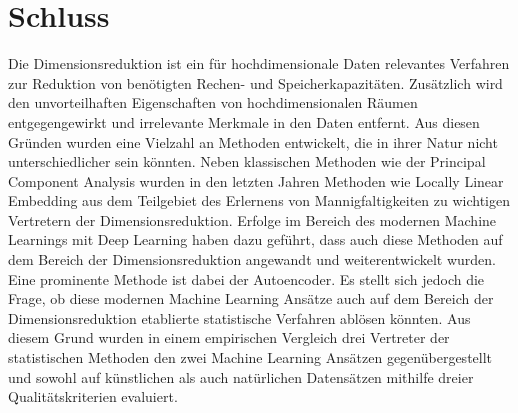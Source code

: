 \chapter{Schluss}
\label{ch:Schluss}

Die Dimensionsreduktion ist ein für hochdimensionale Daten relevantes Verfahren zur Reduktion von
benötigten Rechen- und Speicherkapazitäten. Zusätzlich wird den unvorteilhaften Eigenschaften von
hochdimensionalen Räumen entgegengewirkt und irrelevante Merkmale in den Daten entfernt. Aus diesen
Gründen wurden eine Vielzahl an Methoden entwickelt, die in ihrer Natur nicht unterschiedlicher
sein könnten. Neben klassischen Methoden wie der Principal Component Analysis wurden in den letzten
Jahren Methoden wie Locally Linear Embedding aus dem Teilgebiet des Erlernens von
Mannigfaltigkeiten zu wichtigen Vertretern der Dimensionsreduktion. Erfolge im Bereich des modernen
Machine Learnings mit Deep Learning haben dazu geführt, dass auch diese Methoden auf dem Bereich
der Dimensionsreduktion angewandt und weiterentwickelt wurden. Eine prominente Methode ist dabei
der Autoencoder. Es stellt sich jedoch die Frage, ob diese modernen Machine Learning Ansätze auch
auf dem Bereich der Dimensionsreduktion etablierte statistische Verfahren ablösen könnten. Aus
diesem Grund wurden in einem empirischen Vergleich drei Vertreter der statistischen Methoden den
zwei Machine Learning Ansätzen gegenübergestellt und sowohl auf künstlichen als auch natürlichen
Datensätzen mithilfe dreier Qualitätskriterien evaluiert.

